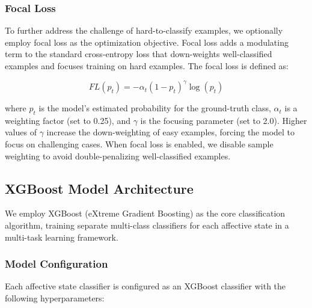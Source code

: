 \documentclass[11pt,a4paper]{article}
\begin{document}
\subsubsection{Focal Loss}

To further address the challenge of hard-to-classify examples, we optionally employ focal loss as the optimization objective. Focal loss adds a modulating term to the standard cross-entropy loss that down-weights well-classified examples and focuses training on hard examples. The focal loss is defined as:

\begin{equation}
FL(p_t) = -\alpha_t (1 - p_t)^{\gamma} \log(p_t)
\end{equation}

where $p_t$ is the model's estimated probability for the ground-truth class, $\alpha_t$ is a weighting factor (set to 0.25), and $\gamma$ is the focusing parameter (set to 2.0). Higher values of $\gamma$ increase the down-weighting of easy examples, forcing the model to focus on challenging cases. When focal loss is enabled, we disable sample weighting to avoid double-penalizing well-classified examples.

\subsection{XGBoost Model Architecture}

We employ XGBoost (eXtreme Gradient Boosting) as the core classification algorithm, training separate multi-class classifiers for each affective state in a multi-task learning framework.

\subsubsection{Model Configuration}

Each affective state classifier is configured as an XGBoost classifier with the following hyperparameters:
\end{document}
